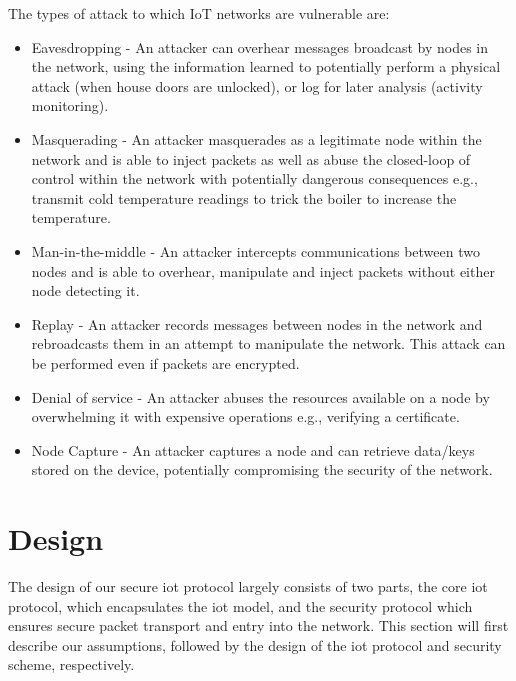 \documentclass[conference]{./sty/IEEEtran}
\begin{document}
The types of attack to which IoT networks are vulnerable are:
\begin{itemize}
  \item Eavesdropping - An attacker can overhear messages broadcast by nodes in the network, using the information learned to potentially perform a physical attack (when house doors are unlocked), or log for later analysis (activity monitoring).  
  \item Masquerading - An attacker masquerades as a legitimate node within the network and is able to inject packets as well as abuse the closed-loop of control within the network with potentially dangerous consequences e.g., transmit cold temperature readings to trick the boiler to increase the temperature.
  \item Man-in-the-middle - An attacker intercepts communications between two nodes and is able to overhear, manipulate and inject packets without either node detecting it. 
  \item Replay - An attacker records messages between nodes in the network and rebroadcasts them in an attempt to manipulate the network. This attack can be performed even if packets are encrypted. 
  \item Denial of service - An attacker abuses the resources available on a node by overwhelming it with expensive operations e.g., verifying a certificate.
  \item Node Capture - An attacker captures a node and can retrieve data/keys stored on the device, potentially compromising the security of the network.
\end{itemize}


\section{Design} %
\label{sec:design}
The design of our secure iot protocol largely consists of two parts, the core iot protocol, which encapsulates the iot model, and the security protocol which ensures secure packet transport and entry into the network. This section will first describe our assumptions, followed by the design of the iot protocol and security scheme, respectively.
\end{document}
